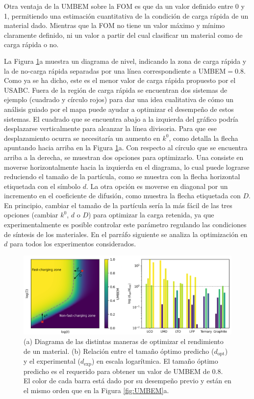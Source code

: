 Otra ventaja de la UMBEM sobre la FOM es que da un valor definido entre 0 y 1,
permitiendo una estimación cuantitativa de la condición de carga rápida de un
material dado. Mientras que la FOM no tiene un valor máximo y mínimo claramente
definido, ni un valor a partir del cual clasificar un material como de carga 
rápida o no.

La Figura \ref{fig:sizes}a muestra un diagrama de nivel, indicando la zona de 
carga rápida y la de no-carga rápida separadas por una línea correspondiente a
UMBEM$ = 0.8$. Como ya se ha dicho, este es el menor valor de carga rápida 
propuesto por el USABC. Fuera de la región de carga rápida se encuentran dos 
sistemas de ejemplo (cuadrado y círculo rojos) para dar una idea cualitativa de 
cómo un análisis guiado por el mapa puede ayudar a optimizar el desempeño de 
estos sistemas. El cuadrado que se encuentra abajo a la izquierda del gráfico 
podría desplazarse verticalmente para alcanzar la línea divisoria. Para que 
ese desplazamiento ocurra se necesitaría un aumento en $k^0$, como detalla la 
flecha apuntando hacia arriba en la Figura \ref{fig:sizes}a. Con respecto al 
círculo que se encuentra arriba a la derecha, se muestran dos opciones para
optimizarlo. Una consiste en moverse horizontalmente hacia la izquierda en el 
diagrama, lo cual puede lograrse reduciendo el tamaño de la partícula, como 
se muestra con la flecha horizontal etiquetada con el símbolo $d$. La otra opción
es moverse en diagonal por un incremento en el coeficiente de difusión, como 
muestra la flecha etiquetada con $D$. En principio, cambiar el tamaño de la 
partícula sería la más fácil de las tres opciones (cambiar $k^0$, $d$ o $D$) para 
optimizar la carga retenida, ya que experimentalmente es posible controlar este 
parámetro regulando las condiciones de síntesis de los materiales. En el parráfo
siguiente se analiza la optimización en $d$ para todos los experimentos 
considerados.

\begin{figure}[h!]
    \centering
    \includegraphics[width=\textwidth]{FastCharging/umbem/sizes.png}
    \caption{(a) Diagrama de las distintas maneras de optimizar el rendimiento 
    de un material. (b) Relación entre el tamaño óptimo predicho 
    ($d_{\text{opt}}$) y el experimental ($d_{\text{exp}}$) en escala logarítmica.
    El tamaño óptimo predicho es el requerido para obtener un valor de UMBEM 
    de 0.8. El color de cada barra está dado por su desempeño previo y están en 
    el mismo orden que en la Figura \ref{fig:UMBEM}a.}
    \label{fig:sizes}
\end{figure}

